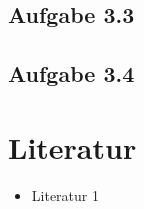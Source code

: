 \documentclass[a4paper,12pt]{article}
\begin{document}
	\subsection{Aufgabe 3.3}
	\subsection{Aufgabe 3.4}
	\newpage
	\section{Literatur}
	\begin{itemize}
		\item Literatur 1
	\end{itemize}
	\listoffigures
\end{document}
